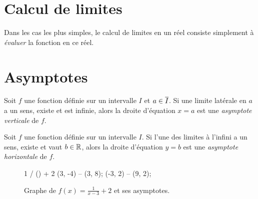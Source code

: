 \documentclass[main.tex]{subfiles}
\begin{document}
\section{Calcul de limites}

Dans les cas les plus simples,
le calcul de limites en un réel consiste simplement à \emph{évaluer} la fonction en ce réel.

\section{Asymptotes}

\begin{definition}

    Soit $f$ une fonction définie sur un intervalle $I$ et $a \in \overline{I}$.
    Si une limite latérale en $a$ a un sens, existe et est infinie,
    alors la droite d'équation $x = a$ est
    une \emph{asymptote verticale} de $f$.
\end{definition}

\begin{definition}

    Soit $f$ une fonction définie sur un intervalle $I$.
    Si l'une des limites à l'infini a un sens, existe et vaut $b \in \mathbb{R}$,
    alors la droite d'équation $y = b$ est
    une \emph{asymptote horizontale} de $f$.
\end{definition}

\begin{figure}
    \centering
    \begin{plot}{0.5}{-3}{-4}{9}{8}
         {1 / () + 2}
        \drawline (3, -4) -- (3, 8);
        \drawline (-3, 2) -- (9, 2);
    \end{plot}
    \caption{Graphe de $f(x) = \frac 1 {x - 3} + 2$ et ses asymptotes.}
\end{figure}
\end{document}
